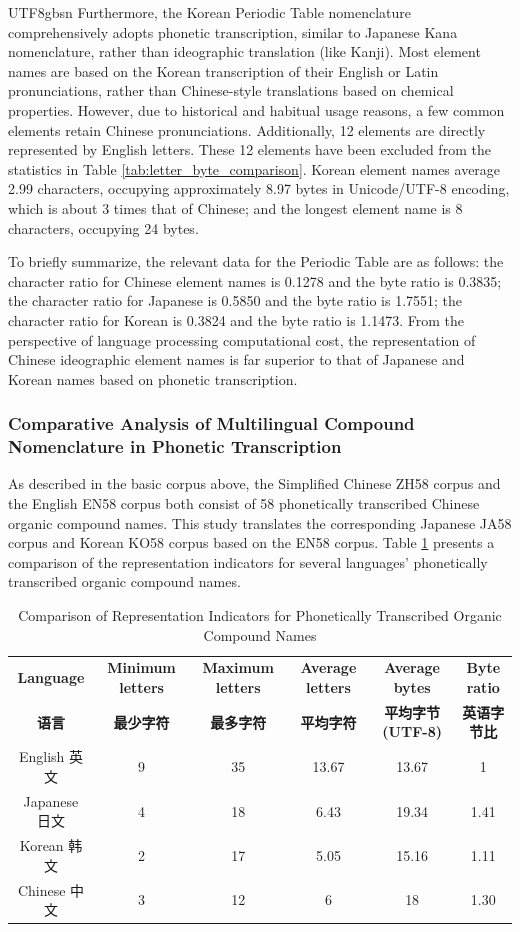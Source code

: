 \documentclass[conference]{IEEEtran}
\begin{document}
\begin{CJK*}{UTF8}{gbsn}
Furthermore, the Korean Periodic Table nomenclature comprehensively adopts phonetic transcription, similar to Japanese Kana nomenclature, rather than ideographic translation (like Kanji). Most element names are based on the Korean transcription of their English or Latin pronunciations, rather than Chinese-style translations based on chemical properties. However, due to historical and habitual usage reasons, a few common elements retain Chinese pronunciations. Additionally, 12 elements are directly represented by English letters. These 12 elements have been excluded from the statistics in Table \ref{tab:letter_byte_comparison}. Korean element names average 2.99 characters, occupying approximately 8.97 bytes in Unicode/UTF-8 encoding, which is about 3 times that of Chinese; and the longest element name is 8 characters, occupying 24 bytes.

To briefly summarize, the relevant data for the Periodic Table are as follows: the character ratio for Chinese element names is 0.1278 and the byte ratio is 0.3835; the character ratio for Japanese is 0.5850 and the byte ratio is 1.7551; the character ratio for Korean is 0.3824 and the byte ratio is 1.1473. From the perspective of language processing computational cost, the representation of Chinese ideographic element names is far superior to that of Japanese and Korean names based on phonetic transcription.

\subsubsection{Comparative Analysis of Multilingual Compound Nomenclature in Phonetic Transcription} 
As described in the basic corpus above, the Simplified Chinese ZH58 corpus and the English EN58 corpus both consist of 58 phonetically transcribed Chinese organic compound names. This study translates the corresponding Japanese JA58 corpus and Korean KO58 corpus based on the EN58 corpus. Table \ref{tab:comparison} presents a comparison of the representation indicators for several languages' phonetically transcribed organic compound names.

\begin{table}[htbp]
\centering
\caption{Comparison of Representation Indicators for Phonetically Transcribed Organic Compound Names}
\label{tab:comparison}
\begin{tabular}{|c|c|c|c|c|c|}
\hline
\textbf{Language} & \textbf{Minimum letters} & \textbf{Maximum letters} & \textbf{Average letters} & \textbf{Average bytes} & \textbf{Byte ratio} \\
\textbf{语言} & \textbf{最少字符} & \textbf{最多字符} & \textbf{平均字符} & \textbf{平均字节(UTF-8)} & \textbf{英语字节比} \\
\hline
English 英文 & 9 & 35 & 13.67 & 13.67 & 1 \\
\hline
Japanese 日文 & 4 & 18 & 6.43 & 19.34 & 1.41 \\
\hline
Korean 韩文 & 2 & 17 & 5.05 & 15.16 & 1.11 \\
\hline
Chinese 中文 & 3 & 12 & 6 & 18 & 1.30 \\
\hline
\end{tabular}
\end{table}


\end{CJK*}
\end{document}
